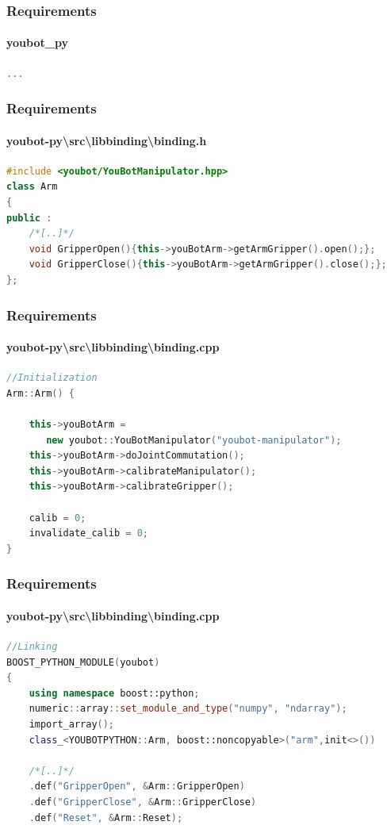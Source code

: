 \documentclass{beamer}
\begin{document}
\begin{frame}[fragile]
 \frametitle{Requirements}
 \framesubtitle{youbot\_py}
\begin{lstlisting}[language=C++]
...
\end{lstlisting}
\end{frame}

\begin{frame}[fragile]
 \frametitle{Requirements}
 \framesubtitle{youbot-py\textbackslash src\textbackslash libbinding\textbackslash binding.h}
\begin{lstlisting}[language=C++]
#include <youbot/YouBotManipulator.hpp>
class Arm
{
public :
	/*[..]*/
	void GripperOpen(){this->youBotArm->getArmGripper().open();};
	void GripperClose(){this->youBotArm->getArmGripper().close();};
};
\end{lstlisting}
\end{frame}


\begin{frame}[fragile]
 \frametitle{Requirements}
 \framesubtitle{youbot-py\textbackslash src\textbackslash libbinding\textbackslash binding.cpp}
\begin{lstlisting}[language=C++]
//Initialization
Arm::Arm() {

	this->youBotArm =
	   new youbot::YouBotManipulator("youbot-manipulator");
	this->youBotArm->doJointCommutation();
	this->youBotArm->calibrateManipulator();
	this->youBotArm->calibrateGripper();

	calib = 0;
	invalidate_calib = 0;
}
 \end{lstlisting}
\end{frame}

\begin{frame}[fragile]
 \frametitle{Requirements}
 \framesubtitle{youbot-py\textbackslash src\textbackslash libbinding\textbackslash binding.cpp}
\begin{lstlisting}[language=C++]
//Linking
BOOST_PYTHON_MODULE(youbot)
{
    using namespace boost::python;
    numeric::array::set_module_and_type("numpy", "ndarray"); 
    import_array();
    class_<YOUBOTPYTHON::Arm, boost::noncopyable>("arm",init<>())

	/*[..]*/
	.def("GripperOpen", &Arm::GripperOpen)
	.def("GripperClose", &Arm::GripperClose)
	.def("Reset", &Arm::Reset);
\end{lstlisting}
\end{frame}
\end{document}

